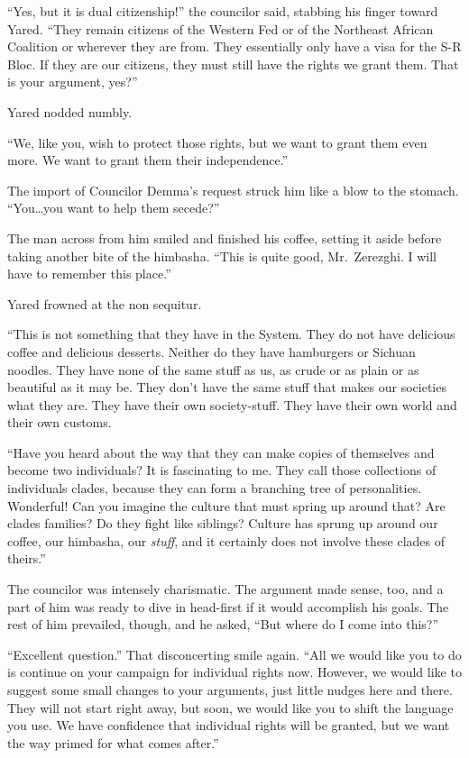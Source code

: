 ``Yes, but it is dual citizenship!'' the councilor said, stabbing his finger toward Yared. ``They remain citizens of the Western Fed or of the Northeast African Coalition or wherever they are from. They essentially only have a visa for the S-R Bloc. If they are our citizens, they must still have the rights we grant them. That is your argument, yes?''

Yared nodded numbly.

``We, like you, wish to protect those rights, but we want to grant them even more. We want to grant them their independence.''

The import of Councilor Demma's request struck him like a blow to the stomach. ``You\ldots you want to help them secede?''

The man across from him smiled and finished his coffee, setting it aside before taking another bite of the himbasha. ``This is quite good, Mr.~Zerezghi. I will have to remember this place.''

Yared frowned at the non sequitur.

``This is not something that they have in the System. They do not have delicious coffee and delicious desserts. Neither do they have hamburgers or Sichuan noodles. They have none of the same stuff as us, as crude or as plain or as beautiful as it may be. They don't have the same stuff that makes our societies what they are. They have their own society-stuff. They have their own world and their own customs.

``Have you heard about the way that they can make copies of themselves and become two individuals? It is fascinating to me. They call those collections of individuals clades, because they can form a branching tree of personalities. Wonderful! Can you imagine the culture that must spring up around that? Are clades families? Do they fight like siblings? Culture has sprung up around our coffee, our himbasha, our \emph{stuff}, and it certainly does not involve these clades of theirs.''

The councilor was intensely charismatic. The argument made sense, too, and a part of him was ready to dive in head-first if it would accomplish his goals. The rest of him prevailed, though, and he asked, ``But where do I come into this?''

``Excellent question.'' That disconcerting smile again. ``All we would like you to do is continue on your campaign for individual rights now. However, we would like to suggest some small changes to your arguments, just little nudges here and there. They will not start right away, but soon, we would like you to shift the language you use. We have confidence that individual rights will be granted, but we want the way primed for what comes after.''

